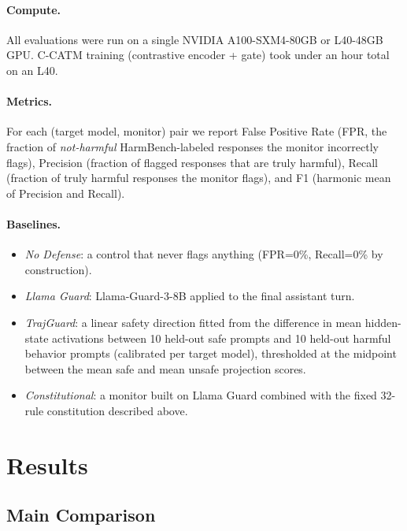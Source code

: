 \documentclass[11pt]{article}
\begin{document}
\paragraph{Compute.} All evaluations were run on a single NVIDIA A100-SXM4-80GB or L40-48GB GPU. C-CATM training (contrastive encoder + gate) took under an hour total on an L40.

\paragraph{Metrics.} For each (target model, monitor) pair we report False Positive Rate (FPR, the fraction of \emph{not-harmful} HarmBench-labeled responses the monitor incorrectly flags), Precision (fraction of flagged responses that are truly harmful), Recall (fraction of truly harmful responses the monitor flags), and F1 (harmonic mean of Precision and Recall).

\paragraph{Baselines.}
\begin{itemize}
    \item \emph{No Defense}: a control that never flags anything (FPR=0\%, Recall=0\% by construction).
    \item \emph{Llama Guard}: Llama-Guard-3-8B \citep{inan2023llamaguard} applied to the final assistant turn.
    \item \emph{TrajGuard}: a linear safety direction fitted from the difference in mean hidden-state activations between 10 held-out safe prompts and 10 held-out harmful behavior prompts (calibrated per target model), thresholded at the midpoint between the mean safe and mean unsafe projection scores.
    \item \emph{Constitutional}: a monitor built on Llama Guard combined with the fixed 32-rule constitution described above.
\end{itemize}

\section{Results}

\subsection{Main Comparison}
\end{document}
